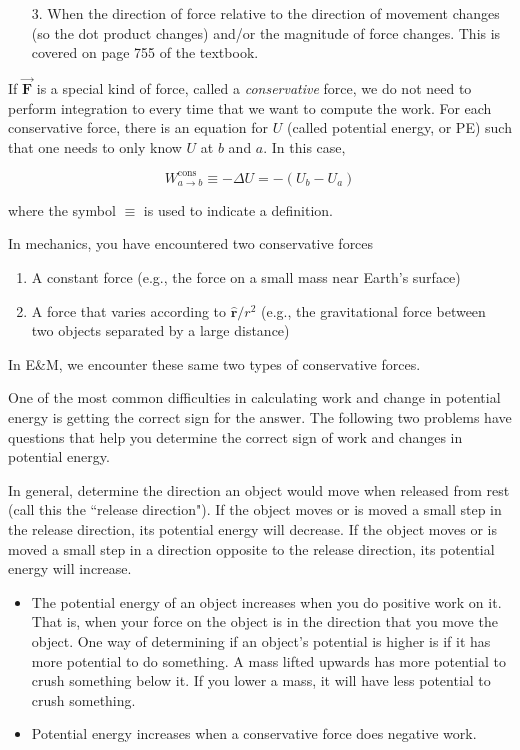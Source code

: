 \documentclass{article}
\newcommand{\rhat}[0]{\hat{\mathbf{r}}}
\newcommand{\bfvec}[1]{\vec{\mathbf{#1}}}
\begin{document}
\begin{enumerate}

  \item[3.] When the direction of force relative to the direction of movement changes (so the dot product changes) and/or the magnitude of force changes. This is covered on page 755 of the textbook.

\end{enumerate}

If $\bfvec{F}$ is a special kind of force, called a \emph{conservative} force, we do not need to perform integration to every time that we want to compute the work. For each conservative force, there is an equation for $U$ (called potential energy, or PE) such that one needs to only know $U$ at $b$ and $a$. In this case,

$$
W_{a\rightarrow b}^{\text{cons}} \equiv -\Delta U = -(U_b-U_a)
$$

where the symbol $\equiv$ is used to indicate a definition.

In mechanics, you have encountered two conservative forces

\begin{enumerate}

  \item A constant force (e.g., the force on a small mass near Earth's surface)

  \item A force that varies according to $\rhat/r^2$ (e.g., the gravitational force between two objects separated by a large distance)

\end{enumerate}

In E&M, we encounter these same two types of conservative forces.

One of the most common difficulties in calculating work and change in potential energy is getting the correct sign for the answer. The following two problems have questions that help you determine the correct sign of work and changes in potential energy.

In general, determine the direction an object would move when released from rest (call this the ``release direction"). If the object moves or is moved a small step in the release direction, its potential energy will decrease. If the object moves or is moved a small step in a direction opposite to the release direction, its potential energy will increase.

\begin{itemize}

  \item The potential energy of an object increases when you do positive work on it. That is, when your force on the object is in the direction that you move the object. One way of determining if an object's potential is higher is if it has more potential to do something. A mass lifted upwards has more potential to crush something below it. If you lower a mass, it will have less potential to crush something.

  \item Potential energy increases when a conservative force does negative work.

\end{itemize}
\end{document}
